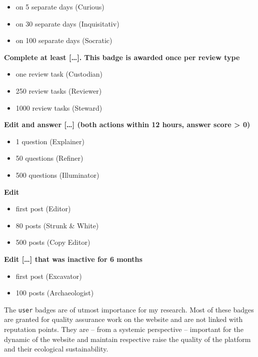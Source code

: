 \documentclass[]{book}
\providecommand{\tightlist}{%
  \setlength{\itemsep}{0pt}\setlength{\parskip}{0pt}}
\theoremstyle{definition}
\theoremstyle{definition}
\theoremstyle{definition}
\theoremstyle{remark}
\begin{document}
\begin{itemize}
\tightlist
\item
  on 5 separate days (Curious)
\item
  on 30 separate days (Inquisitativ)
\item
  on 100 separate days (Socratic)
\end{itemize}

\textbf{Complete at least {[}\ldots{}{]}. This badge is awarded once per
review type}

\begin{itemize}
\tightlist
\item
  one review task (Custodian)
\item
  250 review tasks (Reviewer)
\item
  1000 review tasks (Steward)
\end{itemize}

\textbf{Edit and answer {[}\ldots{}{]} (both actions within 12 hours,
answer score \textgreater{} 0)}

\begin{itemize}
\tightlist
\item
  1 question (Explainer)
\item
  50 questions (Refiner)
\item
  500 questions (Illuminator)
\end{itemize}

\textbf{Edit}

\begin{itemize}
\tightlist
\item
  first post (Editor)
\item
  80 posts (Strunk \& White)
\item
  500 posts (Copy Editor)
\end{itemize}

\textbf{Edit {[}\ldots{}{]} that was inactive for 6 months}

\begin{itemize}
\tightlist
\item
  first post (Excavator)
\item
  100 posts (Archaeologist)
\end{itemize}

The \texttt{user} badges are of utmost importance for my research. Most
of these badges are granted for quality assurance work on the website
and are not linked with reputation points. They are -- from a systemic
perspective -- important for the dynamic of the website and maintain
respective raise the quality of the platform and their ecological
sustainability.
\end{document}
